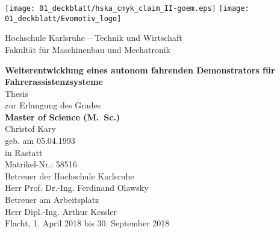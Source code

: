 \renewcommand{\maketitle}{%

\begin{titlepage}
	\thispagestyle{empty}
	\oddsidemargin14mm
	\evensidemargin4mm
	\centering
	\begin{center}
		

		\texttt{[image: 01\_deckblatt/hska\_cmyk\_claim\_II-goem.eps]} \hfill
		\texttt{[image: 01\_deckblatt/Evomotiv\_logo]}\\ 
		
		\vspace{2em}
		
		\large{Hochschule Karlsruhe -- Technik und Wirtschaft \\ Fakultät für Maschinenbau und Mechatronik}\\
		
		\vspace{10mm}
	
		\textsf{
		{\huge  \bfseries Weiterentwicklung eines autonom fahrenden Demonstrators für Fahrerassistenzsysteme\\}}
		\vspace{15mm}
		\large{Thesis \\zur Erlangung des Grades \\ \vspace{1ex}
		\bfseries Master of Science (M.~Sc.)}
		\vspace{15mm}\\
		Christof Kary\\
		geb. am 05.04.1993\\
		in Rastatt\\
		Matrikel-Nr.: 58516\\
		
		\vspace{15mm}
		Betreuer der Hochschule Karlsruhe\\
		Herr Prof. Dr.-Ing. Ferdinand Olawsky\\
		\vspace{1em}
		Betreuer am Arbeitsplatz\\
		Herr Dipl.-Ing. Arthur Kessler\\
		
		\vspace{10mm}
		Flacht, 1. April 2018 bis 30. September 2018\\

	\end{center}

\end{titlepage}
}


\maketitle
